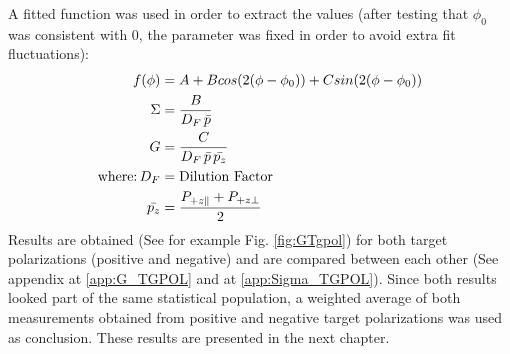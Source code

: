 A fitted function was used in order to extract the values (after testing that $\phi_0$ was consistent with 0, the parameter was fixed in order to avoid extra fit fluctuations):
\begin{align}
  f(\phi) & = A + B cos(2(\phi-\phi_0)) + C sin(2(\phi-\phi_0)) \\
  \Sigma & = \frac{B}{D_F \, \bar{p}} \\
  G & = \frac{C}{D_F \, \bar{p} \,\bar{p_z}} \\
    \textnormal{where:} \, D_F & =   \textnormal{Dilution Factor} \\
    \bar{p_z} & =  \frac{P_{+z\parallel}+P_{+z\perp}}{2}
\end{align}
Results are obtained (See for example Fig. \ref{fig:GTgpol}) for both target polarizations (positive and negative) and are compared between each other (See appendix at \ref{app:G_TGPOL} and at \ref{app:Sigma_TGPOL}). Since both results looked part of the same statistical population, a weighted average of both measurements obtained from positive and negative target polarizations was used as conclusion. These results are presented in the next chapter.
